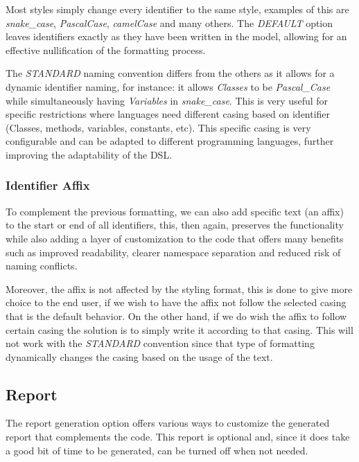 Most styles simply change every \gls{identifier} to the same style, examples of this are \textit{snake\_case}, \textit{PascalCase}, \textit{camelCase} and many others. The \textit{DEFAULT} option leaves identifiers exactly as they have been written in the model, allowing for an effective nullification of the formatting process.

The \textit{STANDARD} naming convention differs from the others as it allows for a dynamic \gls{identifier} naming, for instance: it allows \textit{Classes} to be \textit{Pascal\_Case} while simultaneously having \textit{Variables} in \textit{snake\_case}. This is very useful for specific restrictions where languages need different casing based on \gls{identifier} (Classes, methods, variables, constants, etc). This specific casing is very configurable and can be adapted to different programming languages, further improving the adaptability of the \gls{DSL}.


\subsubsection{Identifier Affix}
\label{sec:dsl_name_affix}

To complement the previous formatting, we can also add specific text (an affix) to the start or end of all \glspl{identifier}, this, then again, preserves the functionality while also adding a layer of customization to the code that offers many benefits such as improved readability, clearer namespace separation and reduced risk of naming conflicts.

Moreover, the affix is not affected by the styling format, this is done to give more choice to the end user, if we wish to have the affix not follow the selected casing that is the default behavior. On the other hand, if we do wish the affix to follow certain casing the solution is to simply write it according to that casing. This will not work with the \textit{STANDARD} convention since that type of formatting dynamically changes the casing based on the usage of the text.


\subsection{Report}
\label{sec:dsl_report}

The report generation option offers various ways to customize the generated report that complements the code. This report is optional and, since it does take a good bit of time to be generated, can be turned off when not needed.

